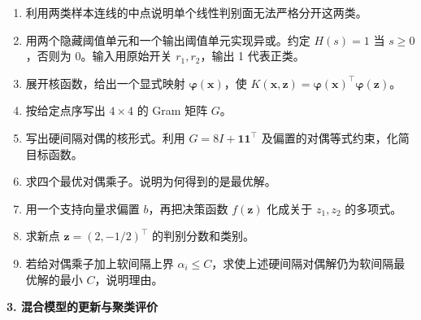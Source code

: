 \begin{enumerate}[label=(\arabic*)]
\item 利用两类样本连线的中点说明单个线性判别面无法严格分开这两类。
\item 用两个隐藏阈值单元和一个输出阈值单元实现异或。约定 $H(s)=1$ 当 $s\ge0$，否则为 0。输入用原始开关 $r_1,r_2$，输出 1 代表正类。
\item 展开核函数，给出一个显式映射 $\bm\varphi(\bm x)$，使 $K(\bm x,\bm z)=\bm\varphi(\bm x)^\top\bm\varphi(\bm z)$。
\item 按给定点序写出 $4\times4$ 的 Gram 矩阵 $G$。
\item 写出硬间隔对偶的核形式。利用 $G=8I+\bm 1\bm 1^\top$ 及偏置的对偶等式约束，化简目标函数。
\item 求四个最优对偶乘子。说明为何得到的是最优解。
\item 用一个支持向量求偏置 $b$，再把决策函数 $f(\bm z)$ 化成关于 $z_1,z_2$ 的多项式。
\item 求新点 $\bm z=(2,-1/2)^\top$ 的判别分数和类别。
\item 若给对偶乘子加上软间隔上界 $\alpha_i\le C$，求使上述硬间隔对偶解仍为软间隔最优解的最小 $C$，说明理由。
\end{enumerate}

\noindent\textbf{3. 混合模型的更新与聚类评价}


